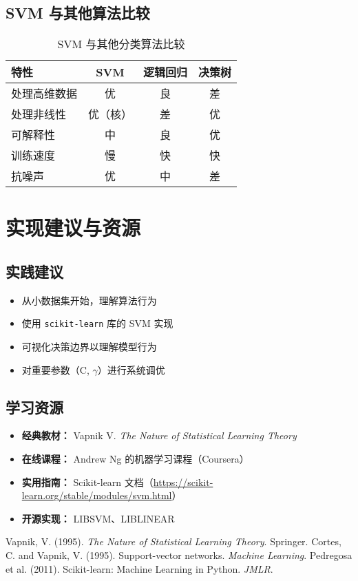 \documentclass{article}
\begin{document}
\subsection*{SVM 与其他算法比较}
\begin{table}[h]
\centering
\caption{SVM 与其他分类算法比较}
\label{tab:comparison}
\begin{tabular}{l|c|c|c}
\toprule
特性 & SVM & 逻辑回归 & 决策树 \\
\midrule
处理高维数据 & 优 & 良 & 差 \\
处理非线性 & 优（核） & 差 & 优 \\
可解释性 & 中 & 良 & 优 \\
训练速度 & 慢 & 快 & 快 \\
抗噪声 & 优 & 中 & 差 \\
\bottomrule
\end{tabular}
\end{table}

\section*{实现建议与资源}
\subsection*{实践建议}
\begin{itemize}
    \item 从小数据集开始，理解算法行为
    \item 使用 \texttt{scikit-learn} 库的 SVM 实现
    \item 可视化决策边界以理解模型行为
    \item 对重要参数（C, $\gamma$）进行系统调优
\end{itemize}

\subsection*{学习资源}
\begin{itemize}
    \item \textbf{经典教材：} Vapnik V. \textit{The Nature of Statistical Learning Theory}
    \item \textbf{在线课程：} Andrew Ng 的机器学习课程（Coursera）
    \item \textbf{实用指南：} Scikit-learn 文档（\url{https://scikit-learn.org/stable/modules/svm.html}）
    \item \textbf{开源实现：} LIBSVM、LIBLINEAR
\end{itemize}

\begin{thebibliography}{9}
Vapnik, V. (1995). \textit{The Nature of Statistical Learning Theory}. Springer.
Cortes, C. and Vapnik, V. (1995). Support-vector networks. \textit{Machine Learning}.
Pedregosa et al. (2011). Scikit-learn: Machine Learning in Python. \textit{JMLR}.
\end{thebibliography}
\end{document}
